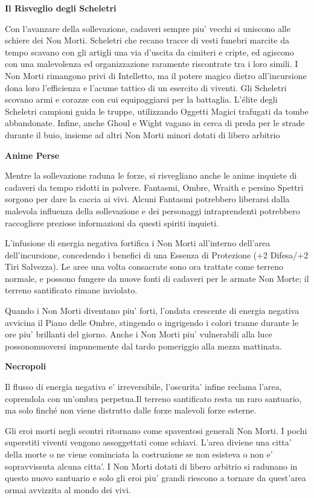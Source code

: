 \documentclass[a4paper,11pt,twoside,openany]{dndbook}
\begin{document}
{\textbf{Il Risveglio degli Scheletri}

Con l'avanzare della sollevazione, cadaveri sempre piu' vecchi si uniscono alle schiere dei Non Morti. Scheletri che recano tracce di vesti funebri marcite da tempo scavano con gli artigli una via d'uscita da cimiteri e cripte, ed agiscono con una malevolenza ed organizzazione raramente riscontrate tra i loro simili. I Non Morti rimangono privi di Intelletto, ma il potere magico dietro all'incursione dona loro l'efficienza e l'acume tattico di un esercito di viventi. Gli Scheletri scovano armi e corazze con cui equipaggiarsi per la battaglia. L'élite degli Scheletri campioni guida le truppe, utilizzando Oggetti Magici trafugati da tombe abbandonate. Infine, anche Ghoul e Wight vagano in cerca di preda per le strade durante il buio, insieme ad altri Non Morti minori dotati di libero arbitrio

\textbf{Anime Perse}

Mentre la sollevazione raduna le forze, si risvegliano anche le anime inquiete di cadaveri da tempo ridotti in polvere. Fantasmi, Ombre, Wraith e persino Spettri sorgono per dare la caccia ai vivi. Alcuni Fantasmi potrebbero liberarsi dalla malevola influenza della sollevazione e dei personaggi intraprendenti potrebbero raccogliere preziose informazioni da questi spiriti inquieti.

L'infusione di energia negativa fortifica i Non Morti all'interno dell'area dell'incursione, concedendo i benefici di una Essenza di Protezione (+2 Difesa/+2 Tiri Salvezza). Le aree una volta consacrate sono ora trattate come terreno normale, e possono fungere da nuove fonti di cadaveri per le armate Non Morte; il terreno santificato rimane inviolato.

Quando i Non Morti diventano piu' forti, l'ondata crescente di energia negativa avvicina il Piano delle Ombre, stingendo o ingrigendo i colori tranne durante le ore piu' brillanti del giorno. Anche i Non Morti piu' vulnerabili alla luce possonomuoversi impunemente dal tardo pomeriggio alla mezza mattinata.

\textbf{Necropoli}

Il flusso di energia negativa e' irreversibile, l'oscurita' infine reclama l'area, coprendola con un'ombra perpetua.Il terreno santificato resta un raro santuario, ma solo finché non viene distrutto dalle forze malevoli forze esterne.

Gli eroi morti negli scontri ritornano come spaventosi generali Non Morti. I pochi superstiti viventi vengono assoggettati come schiavi. L'area diviene una citta' della morte o ne viene cominciata la costruzione se non esisteva o non e' sopravvissuta alcuna citta'. I Non Morti dotati di libero arbitrio si radunano in questo nuovo santuario e solo gli eroi piu' grandi riescono a tornare da quest'area ormai avvizzita al mondo dei vivi.

}
\end{document}
